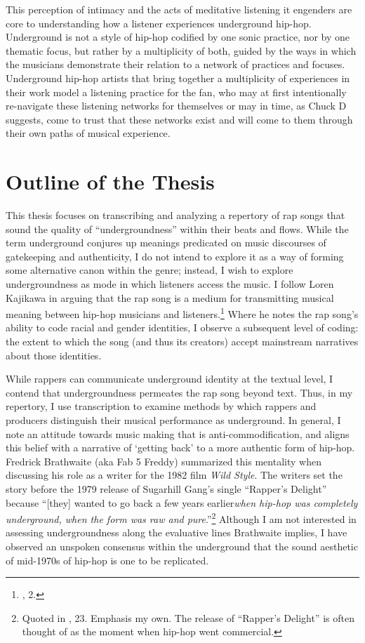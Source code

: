 This perception of intimacy and the acts of meditative listening it engenders are core to understanding how a listener
experiences underground hip-hop. Underground is not a style of hip-hop codified by one sonic practice, nor by one thematic
focus, but rather by a multiplicity of both, guided by the ways in which the musicians demonstrate their relation to a
network of practices and focuses. Underground hip-hop artists that bring together a multiplicity of experiences in their
work model a listening practice for the fan, who may at first intentionally re-navigate these listening networks for themselves
or may in time, as Chuck D suggests, come to trust that these networks exist and will come to them through their own paths of
musical experience.


\section{Outline of the Thesis}

This thesis focuses on transcribing and analyzing a repertory of rap songs that sound
the quality of ``undergroundness'' within their beats and flows. While the term underground 
conjures up meanings predicated on music discourses of gatekeeping and authenticity, I do 
not intend to explore it as a way of forming some alternative canon within the genre; instead, 
I wish to explore undergroundness as mode in which listeners access the music. I follow Loren 
Kajikawa in arguing that the rap song is a medium for transmitting musical meaning between 
hip-hop musicians and listeners.\footnote{\cite{lorenkajikawaSoundingRaceRap2015}, 2.} Where 
he notes the rap song's ability to code racial and gender identities, I observe a subsequent 
level of coding: the extent to which the song (and thus its creators) accept mainstream narratives 
about those identities.

While rappers can communicate underground identity at the textual level, I contend that undergroundness
permeates the rap song beyond text. Thus, in my repertory, I use transcription to examine methods by which
rappers and producers distinguish their musical performance as underground. In general, I note an attitude
towards music making that is anti-commodification, and aligns this belief with a narrative of `getting 
back' to a more authentic form of hip-hop. Fredrick Brathwaite (aka Fab 5 Freddy) summarized this mentality
when discussing his role as a writer for the 1982 film \textit{Wild Style}. The writers set the story 
before the 1979 release of Sugarhill Gang's single ``Rapper's Delight'' because ``[they] wanted to go back
a few years earlier\textellipsis \emph{when hip-hop was completely underground, when the form was raw and
pure}.''\footnote{Quoted in \cite{justinawilliamsRhyminStealinMusical2013}, 23. Emphasis my own. The release
of ``Rapper's Delight'' is often thought of as the moment when hip-hop went commercial.} Although I am not
interested in assessing undergroundness along the evaluative lines Brathwaite implies, I have observed an
unspoken consensus within the underground that the sound aesthetic of mid-1970s of hip-hop is one to be
replicated.

